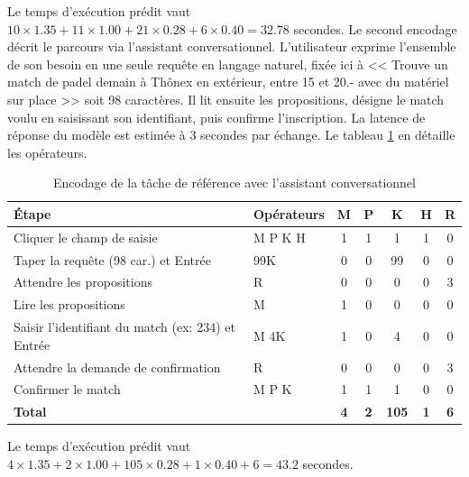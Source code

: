 \documentclass[12pt]{article}
\begin{document}
\vspace{0.2cm}
Le temps d'exécution prédit vaut $10 \times 1.35 + 11 \times 1.00 + 21 \times 0.28 + 6 \times 0.40 = 32.78$ secondes.
\newline\newline
Le second encodage décrit le parcours via l'assistant conversationnel. L'utilisateur exprime l'ensemble de son besoin en une seule requête en langage naturel, fixée ici à << Trouve un match de padel demain à Thônex en extérieur, entre 15 et 20.- avec du matériel sur place >> soit 98 caractères. Il lit ensuite les propositions, désigne le match voulu en saisissant son identifiant, puis confirme l'inscription. La latence de réponse du modèle est estimée à 3 secondes par échange. Le tableau \ref{tab:klm_assistant} en détaille les opérateurs.
\vspace{0.5cm}
\begin{table}[H]
    \centering
    \begin{tabularx}{\textwidth}{|X|l|c|c|c|c|c|}
    \hline
    \rowcolor[gray]{0.9}
    \textbf{Étape} & \textbf{Opérateurs} & \textbf{M} & \textbf{P} & \textbf{K} & \textbf{H} & \textbf{R} \\ \hline
    Cliquer le champ de saisie & M P K H & 1 & 1 & 1 & 1 & 0 \\ \hline
    Taper la requête (98 car.) et Entrée & 99K & 0 & 0 & 99 & 0 & 0 \\ \hline
    Attendre les propositions & R & 0 & 0 & 0 & 0 & 3 \\ \hline
    Lire les propositions & M & 1 & 0 & 0 & 0 & 0 \\ \hline
    Saisir l'identifiant du match (ex: 234) et Entrée & M 4K & 1 & 0 & 4 & 0 & 0 \\ \hline
    Attendre la demande de confirmation & R & 0 & 0 & 0 & 0 & 3 \\ \hline
    Confirmer le match & M P K & 1 & 1 & 1 & 0 & 0 \\ \hline
    \rowcolor[gray]{0.95}
    \textbf{Total} & & \textbf{4} & \textbf{2} & \textbf{105} & \textbf{1} & \textbf{6} \\ \hline
    \end{tabularx}
    \caption{Encodage de la tâche de référence avec l'assistant conversationnel}
    \label{tab:klm_assistant}
\end{table}
\vspace{0.2cm}
Le temps d'exécution prédit vaut $4 \times 1.35 + 2 \times 1.00 + 105 \times 0.28 + 1 \times 0.40 + 6 = 43.2$ secondes.
\newline\newline
\end{document}
